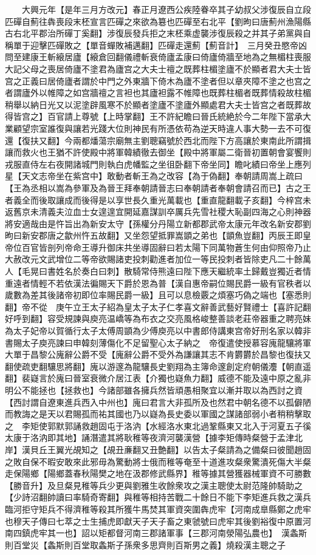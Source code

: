 　　大興元年【是年三月方改元】春正月遼西公疾陸眷卒其子幼叔父涉復辰自立段匹磾自薊往犇喪段末柸宣言匹磾之來欲為簒也匹磾至右北平【劉昫曰唐薊州漁陽縣古右北平郡治所磾丁奚翻】涉復辰發兵拒之末柸乘虚襲涉復辰殺之并其子弟黨與自稱單于迎擊匹磾敗之【單音蟬敗補邁翻】匹磾走還薊【薊音計】　三月癸丑愍帝凶問至建康王斬縗居廬【縗倉回翻儀禮斬衰倚廬孟康曰倚廬倚牆至地為之無楣柱喪服大記父母之喪居倚廬不塗君為廬宫之大夫士䄠之既葬柱楣塗廬不於顯者君大夫士皆宫之正義曰居倚廬者謂於中門之外東牆下倚木為廬不塗者但以章夾障不塗之也宫之者謂廬外以帷障之如宫牆䄠之言袒也其廬袒露不帷障也既葬柱楣者既葬情殺故柱楣稍舉以納日光又以泥塗辟風寒不於顯者塗廬不塗廬外顯處君大夫士皆宫之者既葬故得皆宫之】百官請上尊號【上時掌翻】王不許紀瞻曰晉氏統絶於今二年陛下當承大業顧望宗室誰復與讓若光踐大位則神民有所憑依苟為逆天時違人事大勢一去不可復還【復扶又翻】今兩都燔蕩宗廟無主劉聰竊號於西北而陛下方高讓於東南此所謂揖讓而救火也王猶不許使殿中將軍韓績徹去御坐【殿中將軍屬二衛晉初置朝會宴饗則戎服直侍左右夜開諸城門則執白虎幡監之坐徂卧翻下帝坐同】瞻叱績曰帝坐上應列星【天文志帝坐在紫宫中】敢動者斬王為之改容【為于偽翻】奉朝請周嵩上疏曰【王為丞相以嵩為參軍及為晉王拜奉朝請晉志曰奉朝請者奉朝會請召而已】古之王者義全而後取讓成而後得是以享世長久重光萬載也【重直龍翻載子亥翻】今梓宫未返舊京未清義夫泣血士女遑遑宜開延嘉謀訓卒厲兵先雪社稷大恥副四海之心則神器將安適哉由是忤旨出為新安太守【孫權分丹陽立新都郡武帝太康元年改名新安郡劉昫曰新安郡唐之歙州忤五故翻】又坐怨望抵罪嵩顗之弟也【顗魚豈翻】丙辰王即皇帝位百官皆剖列帝命王導升御床共坐導固辭曰若太陽下同萬物蒼生何由仰照帝乃止大赦改元文武增位二等帝欲賜諸吏投刺勸進者加位一等民投刺者皆除吏凡二十餘萬人【毛晃曰書姓名於奏白曰刺】散騎常侍熊遠曰陛下應天繼統率土歸戴豈獨近者情重遠者情輕不若依漢法徧賜天下爵於恩為普【漢自惠帝嗣位賜民爵一級有官秩者以歲數為差其後諸帝初即位率賜民爵一級】且可以息檢覈之煩塞巧偽之端也【塞悉則翻】帝不從　庚午立王太子紹為皇太子太子仁孝喜文辭善武藝好賢禮士【喜許記翻好呼到翻】容受規諫與庾亮温嶠等為布衣之交亮風格峻整善談老莊帝器重之聘亮妹為太子妃帝以賀循行太子太傅周顗為少傅庾亮以中書郎侍講東宫帝好刑名家以韓非書賜太子庾亮諫曰申韓刻薄傷化不足留聖心太子納之　帝復遣使授慕容廆龍驤將軍大單于昌黎公廆辭公爵不受【廆辭公爵不受外為謙讓其志不肯欝欝於昌黎也復扶又翻使疏吏翻驤思將翻】廆以游邃為龍驤長史劉翔為主簿命邃創定府朝儀灋【朝直遥翻】裴嶷言於廆曰晉室衰微介居江表【介獨也嶷魚力翻】威德不能及遠中原之亂非明公不能拯也【拯救也】今諸部雖各擁兵然皆頑愚相聚宜以漸并取以為西討之資【西討謂自遼東進兵西入中州也】廆曰君言大非孤所及也然君中朝名德不以孤僻陋而教誨之是天以君賜孤而祐其國也乃以嶷為長史委以軍國之謀諸部弱小者稍稍擊取之　李矩使郭默郭誦救趙固屯于洛汭【水經洛水東北過鞏縣東又北入于河夏五子徯太康于洛汭即其地】誦潛遣其將耿稚等夜濟河襲漢營【據李矩傳時粲營于孟津北岸】漢貝丘王翼光覘知之【覘丑亷翻又丑艶翻】以告太子粲請為之備粲曰彼聞趙固之敗自保不暇安敢來此邪毋為驚動將士俄而稚等奄至十道進攻粲衆驚潰死傷大半粲走保陽鄉【陽鄉蓋春秋陽樊之地在汲郡修武縣界】稚等據其營獲器械軍資不可勝數【勝音升】及旦粲見稚等兵少更與劉雅生收餘衆攻之漢主聰使太尉范隆帥騎助之【少詩沼翻帥讀曰率騎奇寄翻】與稚等相持苦戰二十餘日不能下李矩進兵救之漢兵臨河拒守矩兵不得濟稚等殺其所獲牛馬焚其軍資突圍犇虎牢【河南成臯縣鄭之虎牢也穆天子傳曰七萃之士生捕虎即獻天子天子畜之東虢號曰虎牢其後劉裕復中原置河南四鎮虎牢其一也】詔以矩都督河南三郡諸軍事【三郡河南滎陽弘農也】　漢螽斯則百堂災【螽斯則百堂取螽斯子孫衆多思齊則百斯男之義】燒殺漢主聰之子